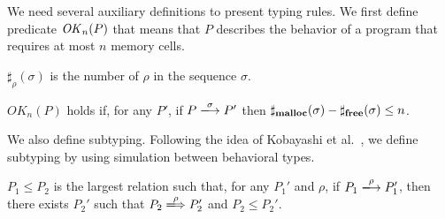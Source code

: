 
We need several auxiliary definitions to present typing rules.  We
first define predicate \(\mathit{OK}_n(P)\) that means that \(P\) describes
the behavior of a program that requires at most \(n\) memory cells.

\begin{myDef}[\(\sharp_{\rho}(\sigma)\)]
\label{df:sharf}
\(\sharp_{\rho}(\sigma)\) is the number of \(\rho\) in the sequence
\(\sigma\).
\end{myDef}


\begin{myDef}
\label{df:okn}
\(OK_{n}(P)\) holds if, for any \(P'\), if \(P
\xlongrightarrow{\sigma}P'\) then
\(\sharp_{\mathbf{malloc}}(\sigma)-\sharp_{\mathbf{free}}(\sigma)\le n\).
\end{myDef}

We also define subtyping.  Following the idea of Kobayashi et
al.~\cite{DBLP:journals/tcs/IgarashiK04}, we define subtyping by
using simulation between behavioral types.

 \begin{myDef}[Subtyping]

\(P_1 \le P_2\) is the largest relation such that, for any \(P_1'\)
and \(\rho\), if \(P_1 \xlongrightarrow{\rho} P_1'\), then there
exists \(P_2'\) such that \(P_2 \xLongrightarrow{\rho} P_2'\) and
\(P_2 \le P_2'\).

\label{df:subtype}
\end{myDef}


